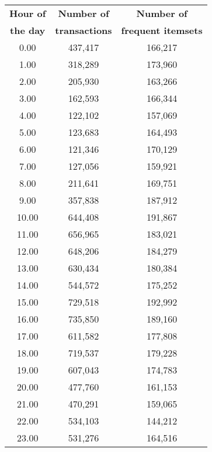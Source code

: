 \begin{table}[h]
\begin{center}
\caption{}
\label{}
\begin{tabular}{|c|c|c|}
\hline
{\bf Hour of}	& {\bf Number of} 	& {\bf	Number of} \\
{\bf the day}	& {\bf transactions} 	& {\bf	frequent itemsets} \\
\hline \hline
0.00  & 437,417 & 166,217 \\ \hline
1.00  & 318,289 & 173,960 \\ \hline
2.00  & 205,930 & 163,266 \\ \hline
3.00  & 162,593 & 166,344 \\ \hline
4.00  & 122,102 & 157,069 \\ \hline
5.00  & 123,683 & 164,493 \\ \hline
6.00  & 121,346 & 170,129 \\ \hline
7.00  & 127,056 & 159,921 \\ \hline
8.00  & 211,641 & 169,751 \\ \hline
9.00  & 357,838 & 187,912 \\ \hline
10.00 & 644,408 & 191,867 \\ \hline
11.00 & 656,965 & 183,021 \\ \hline
12.00 & 648,206 & 184,279 \\ \hline
13.00 & 630,434 & 180,384 \\ \hline
14.00 & 544,572 & 175,252 \\ \hline
15.00 & 729,518 & 192,992 \\ \hline
16.00 & 735,850 & 189,160 \\ \hline
17.00 & 611,582 & 177,808 \\ \hline
18.00 & 719,537 & 179,228 \\ \hline
19.00 & 607,043 & 174,783 \\ \hline
20.00 & 477,760 & 161,153 \\ \hline
21.00 & 470,291 & 159,065 \\ \hline
22.00 & 534,103 & 144,212 \\ \hline
23.00 & 531,276 & 164,516 \\ \hline
\end{tabular}
\end{center}
\end{table}
